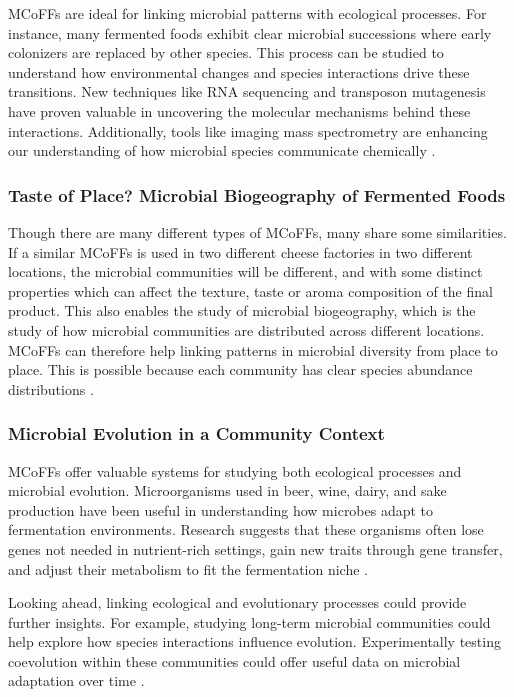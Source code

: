 MCoFFs are ideal for linking microbial patterns with ecological processes. For instance, many fermented foods exhibit clear microbial successions where early colonizers are replaced by other species. This process can be studied to understand how environmental changes and species interactions drive these transitions. New techniques like RNA sequencing and transposon mutagenesis have proven valuable in uncovering the molecular mechanisms behind these interactions. Additionally, tools like imaging mass spectrometry are enhancing our understanding of how microbial species communicate chemically \cite*{L1-FermentedFoods}.

\subsubsection*{Taste of Place? Microbial Biogeography of Fermented Foods}

Though there are many different types of MCoFFs, many share some similarities. If a similar MCoFFs is used in two different cheese factories in two different locations, the microbial communities will be different, and with some distinct properties which can affect the texture, taste or aroma composition of the final product. This also enables the study of microbial biogeography, which is the study of how microbial communities are distributed across different locations. MCoFFs can therefore help linking patterns in microbial diversity from place to place. This is possible because each community has clear species abundance distributions \cite*{L1-FermentedFoods}.

\subsubsection*{Microbial Evolution in a Community Context}

MCoFFs offer valuable systems for studying both ecological processes and microbial evolution. Microorganisms used in beer, wine, dairy, and sake production have been useful in understanding how microbes adapt to fermentation environments. Research suggests that these organisms often lose genes not needed in nutrient-rich settings, gain new traits through gene transfer, and adjust their metabolism to fit the fermentation niche \cite*{L1-FermentedFoods}. 

Looking ahead, linking ecological and evolutionary processes could provide further insights. For example, studying long-term microbial communities could help explore how species interactions influence evolution. Experimentally testing coevolution within these communities could offer useful data on microbial adaptation over time \cite*{L1-FermentedFoods}.

